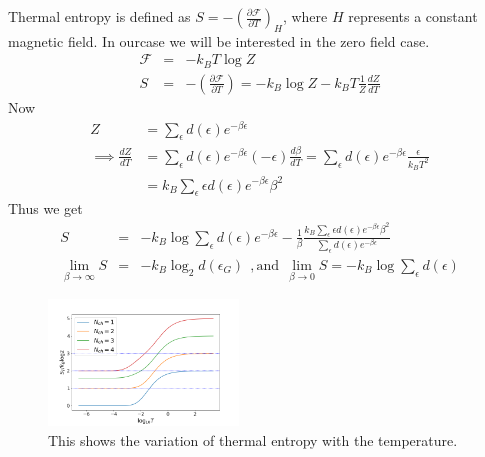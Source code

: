 \documentclass[reprint,prb,superscriptaddress]{revtex4-2}
\begin{document}
Thermal entropy is defined as $S=-(\frac{\partial \mathcal{F}}{\partial T})_H$, where $H$ represents a constant magnetic field. In ourcase we will be interested in the zero field case. 
\begin{eqnarray}
\mathcal{F}&=& -k_B T\log Z \nonumber\\
S &=& -(\frac{\partial \mathcal{F}}{\partial T}) = -k_B \log Z -k_B T \frac{1}{Z} \frac{dZ}{dT}
\end{eqnarray}
Now 
\begin{equation}\begin{aligned}
Z &=\sum_\epsilon  d(\epsilon)e^{-\beta \epsilon}\\
\implies \frac{dZ}{dT} &= \sum_\epsilon d(\epsilon) e^{-\beta \epsilon}  (-\epsilon) \frac{d\beta}{dT} = \sum_\epsilon d(\epsilon) e^{-\beta \epsilon}   \frac{ \epsilon}{k_B T^2}\\
		       &=k_B\sum_\epsilon \epsilon d(\epsilon) e^{-\beta \epsilon} \beta^2   
\end{aligned}\end{equation}
Thus we get
\begin{eqnarray}
S &=& -k_B \log \sum_{\epsilon} d(\epsilon) e^{-\beta \epsilon}  -\frac{1}{\beta} \frac{k_B\sum_\epsilon \epsilon d(\epsilon) e^{-\beta \epsilon} \beta^2   }{\sum_\epsilon  d(\epsilon)e^{-\beta \epsilon}} \nonumber\\
\lim_{\beta\rightarrow \infty} S &=& -k_B \log_2 d(\epsilon_{G})  ~~, \textrm{and}~~ \lim_{\beta\rightarrow 0} S = -k_B \log \sum_\epsilon d(\epsilon) 
\end{eqnarray}
\begin{figure}
\centering
\includegraphics[width=0.45\textwidth]{plt/ThermalEntanglementVS_LogTemperature_}
\caption{This shows the variation of thermal entropy with the temperature.}
\label{fig:thermal_entropy}
\end{figure}
\end{document}
